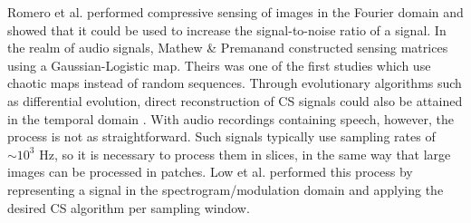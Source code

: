 \documentclass[10pt,a4paper,twoside]{article}
\begin{document}
Romero et al. \cite{Romero2016} performed compressive sensing of images in the Fourier domain and showed that it could be used to increase the signal-to-noise ratio of a signal.  In the realm of audio signals, Mathew \& Premanand \cite{Mathew2016} constructed sensing matrices using a Gaussian-Logistic map. Theirs was one of the first studies which use chaotic maps instead of random sequences. Through evolutionary algorithms such as differential evolution, direct reconstruction of CS signals could also be attained in the temporal domain \cite{Andras2018}. With audio recordings containing speech, however, the process is not as straightforward. Such signals typically use sampling rates of $\sim 10^{3}$ Hz, so it is necessary to process them in slices, in the same way that large images can be processed in patches. Low et al. \cite{Low2018} performed this process by representing a signal in the spectrogram/modulation domain and applying the desired CS algorithm per sampling window.
\end{document}
